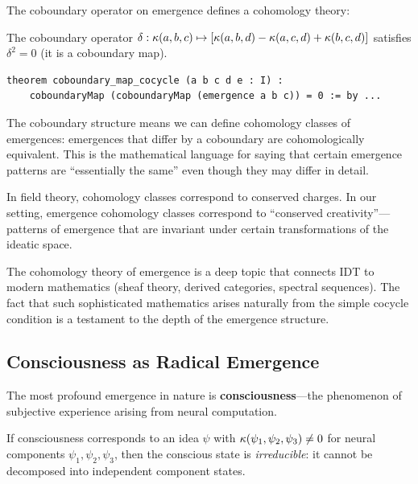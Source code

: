 The coboundary operator on emergence defines a cohomology theory:

\begin{theorem}
\label{thm:coboundary-cocycle}
The coboundary operator $\delta: \kappa(a,b,c) \mapsto [\kappa(a,b,d) - \kappa(a,c,d) + \kappa(b,c,d)]$
satisfies $\delta^2 = 0$ (it is a coboundary map).
\end{theorem}

\begin{lstlisting}[caption={Coboundary structure (IDT\_v3\_Emergence.lean)}]
theorem coboundary_map_cocycle (a b c d e : I) :
    coboundaryMap (coboundaryMap (emergence a b c)) = 0 := by ...
\end{lstlisting}

\begin{interpretation}
The coboundary structure means we can define cohomology classes of emergences:
emergences that differ by a coboundary are cohomologically equivalent. This is
the mathematical language for saying that certain emergence patterns are
``essentially the same'' even though they may differ in detail.

In field theory, cohomology classes correspond to conserved charges. In our
setting, emergence cohomology classes correspond to ``conserved creativity''---patterns
of emergence that are invariant under certain transformations of the ideatic
space.

The cohomology theory of emergence is a deep topic that connects IDT to modern
mathematics (sheaf theory, derived categories, spectral sequences). The fact
that such sophisticated mathematics arises naturally from the simple cocycle
condition is a testament to the depth of the emergence structure.
\end{interpretation}

\subsection{Consciousness as Radical Emergence}

The most profound emergence in nature is \textbf{consciousness}---the phenomenon
of subjective experience arising from neural computation.

\begin{theorem}
\label{thm:consciousness-irreducible}
If consciousness corresponds to an idea $\psi$ with $\kappa(\psi_1, \psi_2, \psi_3) \neq 0$
for neural components $\psi_1, \psi_2, \psi_3$, then the conscious state is
\emph{irreducible}: it cannot be decomposed into independent component states.
\end{theorem}

